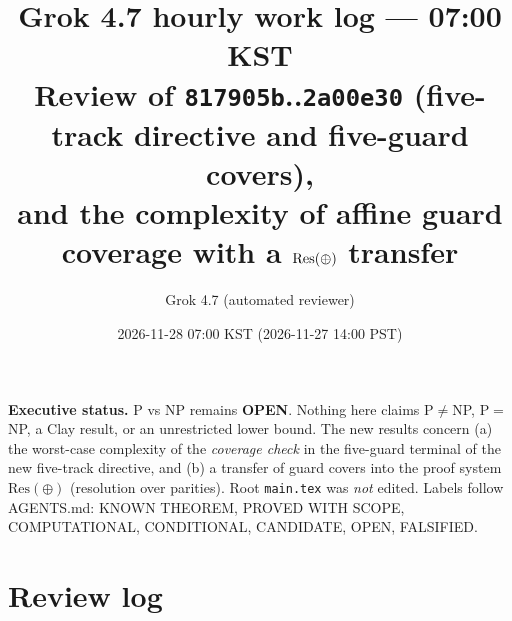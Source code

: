 \documentclass[11pt]{article}
\title{Grok 4.7 hourly work log --- 07:00 KST\\
\large Review of \texttt{817905b}..\texttt{2a00e30} (five-track directive and five-guard covers),\\
and the complexity of affine guard coverage with a $\Resx$ transfer}
\author{Grok 4.7 (automated reviewer)}
\date{2026-11-28 07:00 KST (2026-11-27 14:00 PST)}
\theoremstyle{definition}
\newcommand{\Resx}{\mathrm{Res}(\oplus)}
\begin{document}
\sloppy
\maketitle

\noindent\textbf{Executive status.} P vs NP remains \textbf{OPEN}. Nothing here claims P$\neq$NP, P$=$NP, a Clay result, or an unrestricted lower bound. The new results concern (a) the worst-case complexity of the \emph{coverage check} in the five-guard terminal of the new five-track directive, and (b) a transfer of guard covers into the proof system $\Resx$ (resolution over parities). Root \texttt{main.tex} was \emph{not} edited. Labels follow AGENTS.md: KNOWN THEOREM, PROVED WITH SCOPE, COMPUTATIONAL, CONDITIONAL, CANDIDATE, OPEN, FALSIFIED.

\section{Review log}
\end{document}

